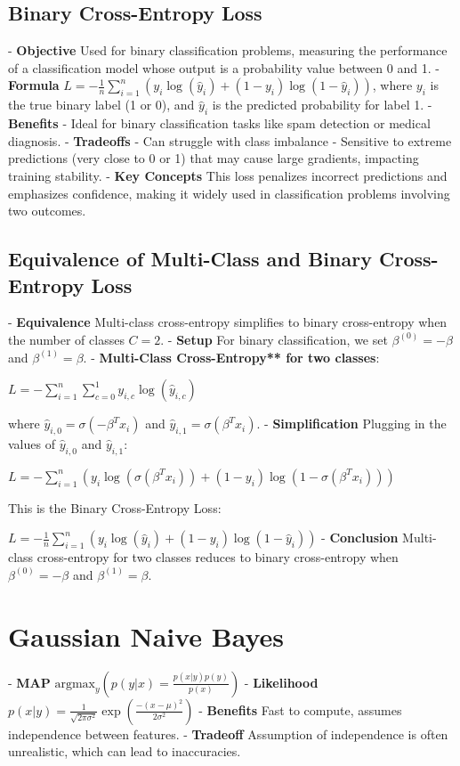 \documentclass[10pt]{article}
\begin{document}
\begin{multicols}{2}
\subsection*{Binary Cross-Entropy Loss}
- \textbf{Objective} Used for binary classification problems, measuring the performance of a classification model whose output is a probability value between 0 and 1.
- \textbf{Formula} $L = -\frac{1}{n} \sum_{i=1}^{n} \left( y_i \log(\hat{y}_i) + (1 - y_i) \log(1 - \hat{y}_i) \right)$, where $y_i$ is the true binary label (1 or 0), and $\hat{y}_i$ is the predicted probability for label 1.
- \textbf{Benefits}
  - Ideal for binary classification tasks like spam detection or medical diagnosis.
- \textbf{Tradeoffs}
  - Can struggle with class imbalance
  - Sensitive to extreme predictions (very close to 0 or 1) that may cause large gradients, impacting training stability.
- \textbf{Key Concepts} This loss penalizes incorrect predictions and emphasizes confidence, making it widely used in classification problems involving two outcomes.

\subsection*{Equivalence of Multi-Class and Binary Cross-Entropy Loss}
- \textbf{Equivalence} Multi-class cross-entropy simplifies to binary cross-entropy when the number of classes $C = 2$.
- \textbf{Setup} For binary classification, we set $\beta^{(0)} = -\beta$ and $\beta^{(1)} = \beta$.
- \textbf{Multi-Class Cross-Entropy** for two classes}:
  
  $L = -\sum_{i=1}^{n} \sum_{c=0}^{1} y_{i,c} \log(\hat{y}_{i,c})$
  
  where $\hat{y}_{i,0} = \sigma(-\beta^T x_i)$ and $\hat{y}_{i,1} = \sigma(\beta^T x_i)$.
- \textbf{Simplification} Plugging in the values of $\hat{y}_{i,0}$ and $\hat{y}_{i,1}$:
  
  $L = -\sum_{i=1}^{n} \left( y_i \log(\sigma(\beta^T x_i)) + (1 - y_i) \log(1 - \sigma(\beta^T x_i)) \right)$
  
 This is the Binary Cross-Entropy Loss:
  
  $L = -\frac{1}{n} \sum_{i=1}^{n} \left( y_i \log(\hat{y}_i) + (1 - y_i) \log(1 - \hat{y}_i) \right)$
- \textbf{Conclusion} Multi-class cross-entropy for two classes reduces to binary cross-entropy when $\beta^{(0)} = -\beta$ and $\beta^{(1)} = \beta$.



\section*{Gaussian Naive Bayes}
- \textbf{MAP} $\text{argmax}_y \left( p(y|x) = \frac{p(x|y)p(y)}{p(x)} \right)$
- \textbf{Likelihood} $p(x|y) = \frac{1}{\sqrt{2\pi\sigma^2}} \exp\left(\frac{-(x-\mu)^2}{2\sigma^2}\right)$
- \textbf{Benefits} Fast to compute, assumes independence between features.
- \textbf{Tradeoff} Assumption of independence is often unrealistic, which can lead to inaccuracies.


\end{multicols}
\end{document}
